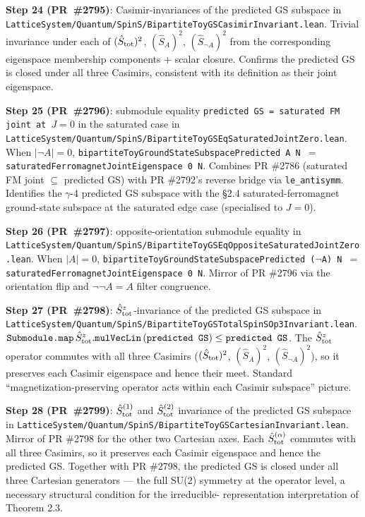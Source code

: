 \documentclass[a4paper,11pt]{article}
\begin{document}
\textbf{Step 24 (PR~\#2795)}: Casimir-invariances of the
predicted GS subspace in
\texttt{LatticeSystem/Quantum/SpinS/BipartiteToyGSCasimirInvariant.lean}.
Trivial invariance under each of $(\hat S_{\rm tot})^2$,
$(\hat S_A)^2$, $(\hat S_{\neg A})^2$ from the corresponding
eigenspace membership components + scalar closure. Confirms the
predicted GS is closed under all three Casimirs, consistent with
its definition as their joint eigenspace.

\textbf{Step 25 (PR~\#2796)}: submodule equality
\texttt{predicted GS = saturated FM joint at $J = 0$} in the
saturated case in
\texttt{LatticeSystem/Quantum/SpinS/BipartiteToyGSEqSaturatedJointZero.lean}.
When $|\neg A| = 0$,
\texttt{bipartiteToyGroundStateSubspacePredicted A N $=$
saturatedFerromagnetJointEigenspace 0 N}. Combines PR \#2786
(saturated FM joint $\subseteq$ predicted GS) with PR \#2792's
reverse bridge via \texttt{le\_antisymm}. Identifies the $\gamma$-4
predicted GS subspace with the §2.4 saturated-ferromagnet
ground-state subspace at the saturated edge case (specialised to
$J = 0$).

\textbf{Step 26 (PR~\#2797)}: opposite-orientation submodule
equality in
\texttt{LatticeSystem/Quantum/SpinS/BipartiteToyGSEqOppositeSaturatedJointZero.lean}.
When $|A| = 0$, \texttt{bipartiteToyGroundStateSubspacePredicted
($\neg$A) N $=$ saturatedFerromagnetJointEigenspace 0 N}. Mirror of
PR \#2796 via the orientation flip and $\neg\neg A = A$ filter
congruence.

\textbf{Step 27 (PR~\#2798)}: $\hat S^z_{\rm tot}$-invariance of
the predicted GS subspace in
\texttt{LatticeSystem/Quantum/SpinS/BipartiteToyGSTotalSpinSOp3Invariant.lean}.
$\texttt{Submodule.map}\,\hat S^z_{\rm tot}.\texttt{mulVecLin}\,
(\texttt{predicted GS}) \le \texttt{predicted GS}$. The
$\hat S^z_{\rm tot}$ operator commutes with all three Casimirs
($(\hat S_{\rm tot})^2$, $(\hat S_A)^2$, $(\hat S_{\neg A})^2$), so
it preserves each Casimir eigenspace and hence their meet.
Standard ``magnetization-preserving operator acts within each
Casimir subspace'' picture.

\textbf{Step 28 (PR~\#2799)}: $\hat S^{(1)}_{\rm tot}$ and
$\hat S^{(2)}_{\rm tot}$ invariance of the predicted GS subspace
in
\texttt{LatticeSystem/Quantum/SpinS/BipartiteToyGSCartesianInvariant.lean}.
Mirror of PR \#2798 for the other two Cartesian axes. Each
$\hat S^{(\alpha)}_{\rm tot}$ commutes with all three Casimirs, so
it preserves each Casimir eigenspace and hence the predicted GS.
Together with PR \#2798, the predicted GS is closed under all three
Cartesian generators — the full SU(2) symmetry at the operator
level, a necessary structural condition for the irreducible-
representation interpretation of Theorem 2.3.
\end{document}
